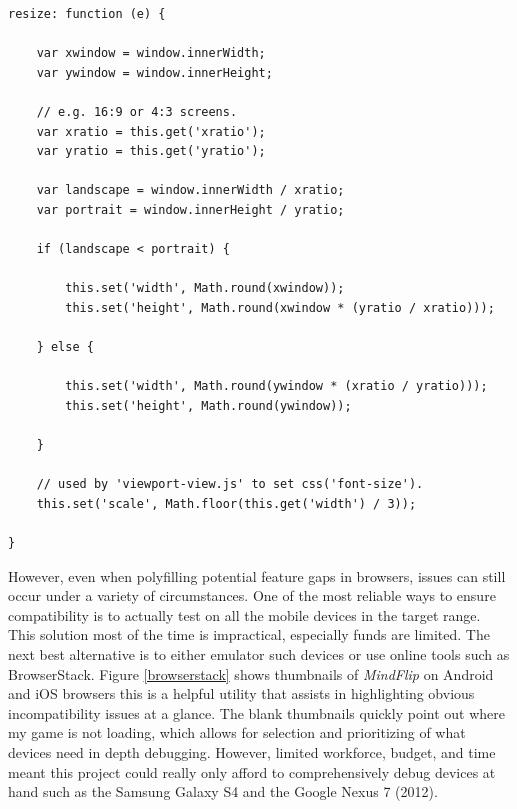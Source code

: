 \documentclass[final]{cmpreport}
\begin{document}
\clearpage
\begin{lstlisting}
resize: function (e) {

    var xwindow = window.innerWidth;
    var ywindow = window.innerHeight;

	// e.g. 16:9 or 4:3 screens.
    var xratio = this.get('xratio');
    var yratio = this.get('yratio');

    var landscape = window.innerWidth / xratio;
    var portrait = window.innerHeight / yratio;

    if (landscape < portrait) {

        this.set('width', Math.round(xwindow));
        this.set('height', Math.round(xwindow * (yratio / xratio)));

    } else {

        this.set('width', Math.round(ywindow * (xratio / yratio)));
        this.set('height', Math.round(ywindow));

    }

	// used by 'viewport-view.js' to set css('font-size').
    this.set('scale', Math.floor(this.get('width') / 3));

}
\end{lstlisting}

However, even when polyfilling potential feature gaps in browsers, issues can still occur under a variety of circumstances. One of the most reliable ways to ensure compatibility is to actually test on all the mobile devices in the target range. This solution most of the time is impractical, especially funds are limited. The next best alternative is to either emulator such devices or use online tools such as BrowserStack\footnotemark. Figure \ref{browserstack} shows thumbnails of \textit{MindFlip} on Android and iOS browsers this is a helpful utility that assists in highlighting obvious incompatibility issues at a glance. The blank thumbnails quickly point out where my game is not loading, which allows for selection and prioritizing of what devices need in depth debugging. However, limited workforce, budget, and time meant this project could really only afford to comprehensively debug devices at hand such as the Samsung Galaxy S4 and the Google Nexus 7 (2012).

\end{document}

